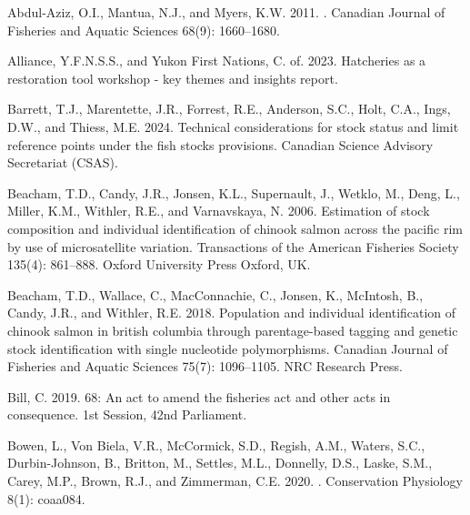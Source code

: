 \documentclass[11pt]{book}
\begin{document}
\hypertarget{refs}{}
\begin{CSLReferences}{1}{0}
%
Abdul-Aziz, O.I., Mantua, N.J., and Myers, K.W. 2011. . Canadian Journal of Fisheries and Aquatic Sciences 68(9): 1660--1680.

%
Alliance, Y.F.N.S.S., and Yukon First Nations, C. of. 2023. Hatcheries as a restoration tool workshop - key themes and insights report.

%
Barrett, T.J., Marentette, J.R., Forrest, R.E., Anderson, S.C., Holt, C.A., Ings, D.W., and Thiess, M.E. 2024. Technical considerations for stock status and limit reference points under the fish stocks provisions. Canadian Science Advisory Secretariat (CSAS).

%
Beacham, T.D., Candy, J.R., Jonsen, K.L., Supernault, J., Wetklo, M., Deng, L., Miller, K.M., Withler, R.E., and Varnavskaya, N. 2006. Estimation of stock composition and individual identification of chinook salmon across the pacific rim by use of microsatellite variation. Transactions of the American Fisheries Society 135(4): 861--888. Oxford University Press Oxford, UK.

%
Beacham, T.D., Wallace, C., MacConnachie, C., Jonsen, K., McIntosh, B., Candy, J.R., and Withler, R.E. 2018. Population and individual identification of chinook salmon in british columbia through parentage-based tagging and genetic stock identification with single nucleotide polymorphisms. Canadian Journal of Fisheries and Aquatic Sciences 75(7): 1096--1105. NRC Research Press.

%
Bill, C. 2019. 68: An act to amend the fisheries act and other acts in consequence. 1st Session, 42nd Parliament.

%
Bowen, L., Von Biela, V.R., McCormick, S.D., Regish, A.M., Waters, S.C., Durbin-Johnson, B., Britton, M., Settles, M.L., Donnelly, D.S., Laske, S.M., Carey, M.P., Brown, R.J., and Zimmerman, C.E. 2020. . Conservation Physiology 8(1): coaa084.


\end{CSLReferences}
\end{document}
